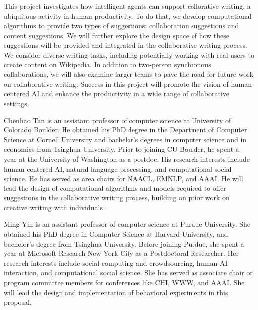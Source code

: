 







This project investigates how intelligent agents can support collorative writing, a ubiquitous activity in human productivity.
To do that, we develop computational algorithms to provide two types of suggestions: collaboration suggestions and content suggestions.
We will further explore the design space of how these suggestions will be provided and integrated in the collaborative writing process.
We consider diverse writing tasks, including potentially working with real users to create content on Wikipedia.
In addition to two-person synchronous collaborations, we will also examine %
larger teams to pave the road for future work on collaborative writing.
Success in this project will promote the vision of human-centered AI and enhance the productivity in a wide range of collaborative settings.

Chenhao Tan is an assistant professor of computer science at University of Colorado Boulder. He obtained his PhD degree in the Department of Computer Science at Cornell University and bachelor's degrees in computer science and in economics from Tsinghua University. Prior to joining CU Boulder, he spent a year at the University of Washington as a postdoc. His research interests include human-centered AI, natural language processing, and computational social science. 
He has served as area chairs for NAACL, EMNLP, and AAAI.
He will lead the design of computational algorithms and models required to offer suggestions in the collaborative writing process, building on prior work on creative writing with individuals \citep{clark+etal18}.

Ming Yin is an assistant professor of computer science at Purdue University. She obtained his PhD degree in Computer Science at Harvard University, and bachelor's degree from Tsinghua University. Before joining Purdue, she spent a year at Microsoft Research New York City as a Postdoctoral Researcher. Her research interests include social computing and crowdsourcing, human-AI interaction, and computational social science. She has served as associate chair or program committee members for conferences like CHI, WWW, and AAAI. She will lead the design and implementation of behavioral experiments in this proposal.